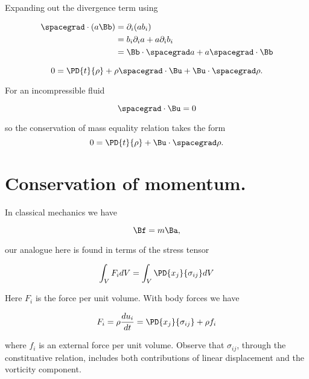 Expanding out the divergence term using

\begin{align*}
\spacegrad \cdot (a \Bb)
&=
\partial_i (a b_i) \\
&=
b_i \partial_i a 
+
a \partial_i b_i \\
&=
\Bb \cdot \spacegrad a
+ a \spacegrad \cdot \Bb
\end{align*}

\begin{equation}\label{eqn:continuumL10:90}
0 = \PD{t}{\rho} 
+ \rho \spacegrad \cdot \Bu
+ \Bu \cdot \spacegrad \rho.
\end{equation}

For an incompressible fluid 

\begin{equation}\label{eqn:continuumL10:110}
\spacegrad \cdot \Bu = 0
\end{equation}

so the conservation of mass equality relation takes the form
\begin{equation}\label{eqn:continuumL10:90}
0 = \PD{t}{\rho} + \Bu \cdot \spacegrad \rho.
\end{equation}

\section{Conservation of momentum.}

In classical mechanics we have

\begin{equation}\label{eqn:continuumL10:130}
\Bf = m \Ba,
\end{equation}

our analogue here is found in terms of the stress tensor

\begin{equation}\label{eqn:continuumL10:150}
\int_V F_i dV = \int_V \PD{x_j}{\sigma_{ij}} dV
\end{equation}

Here $F_i$ is the force per unit volume.  With body forces we have

\begin{equation}\label{eqn:continuumL10:170}
F_i = \rho \frac{du_i}{dt} = \PD{x_j}{\sigma_{ij}} + \rho f_i
\end{equation}

where $f_i$ is an external force per unit volume.  Observe that $\sigma_{ij}$, through the constituative relation, includes both contributions of linear displacement and the vorticity component.  

